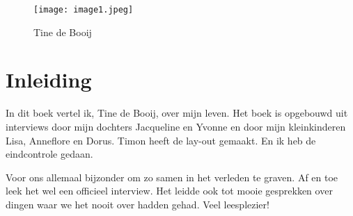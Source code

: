 

\begin{figure}[h!]
    \texttt{[image: image1.jpeg]}
    \caption{Tine de Booij}
\end{figure}

\chapter*{Inleiding} 

In dit boek vertel ik, Tine de Booij, over mijn leven.
Het boek is opgebouwd uit interviews door mijn dochters Jacqueline en Yvonne en door mijn kleinkinderen Lisa, Anneflore en Dorus. Timon heeft de lay-out gemaakt. En ik heb de eindcontrole gedaan.

Voor ons allemaal bijzonder om zo samen in het verleden te graven.
Af en toe leek het wel een officieel interview.
Het leidde ook tot mooie gesprekken over dingen waar we het nooit over hadden gehad.
Veel leesplezier!
